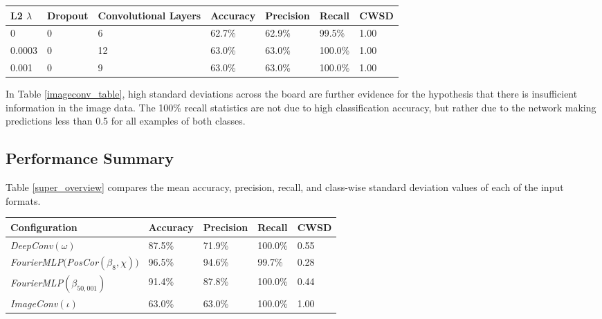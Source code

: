 \documentclass[10pt]{article}
\begin{document}
\begin{minipage}{\textwidth}
    \begin{center}
         \label{imageconv_table}
        \begin{tabular}{|l|l|l|l|l|l|l|}
            \hline
            L2 $\lambda$ & Dropout & Convolutional Layers & Accuracy & Precision & Recall & CWSD \\
            \hline
            0 & 0 & 6 & 62.7\% & 62.9\% & 99.5\% & 1.00 \\
            \hline
            0.0003 & 0 & 12 & 63.0\% & 63.0\% & 100.0\% & 1.00 \\
            \hline
            0.001 & 0 & 9 & 63.0\% & 63.0\% & 100.0\% & 1.00 \\
            \hline
        \end{tabular}
    \end{center}
\end{minipage}

In Table \ref{imageconv_table}, high standard deviations across the board are further evidence for the hypothesis that there is insufficient information in the image data. The 100\% recall statistics are not due to high classification accuracy, but rather due to the network making predictions less than 0.5 for all examples of both classes.

\subsection{Performance Summary}

Table \ref{super_overview} compares the mean accuracy, precision, recall, and class-wise standard deviation values of each of the input formats.

\begin{minipage}{\textwidth}
    \begin{center}
         \label{super_overview}
        \begin{tabular}{|l|l|l|l|l|}
            \hline
            Configuration & Accuracy & Precision & Recall & CWSD \\
            \hline
            {\it DeepConv}$(\omega)$ & 87.5\% & 71.9\% & 100.0\% & 0.55 \\
            \hline
            {\it FourierMLP}$(${\it PosCor}$(\beta_{8}, \chi))$ & 96.5\% & 94.6\% & 99.7\% & 0.28 \\
            \hline
            {\it FourierMLP}$(\beta_{50,001})$ & 91.4\% & 87.8\% & 100.0\% & 0.44 \\
            \hline
            {\it ImageConv}$(\iota)$ & 63.0\% & 63.0\% & 100.0\% & 1.00 \\
            \hline
        \end{tabular}
    \end{center}
\end{minipage}
\end{document}
